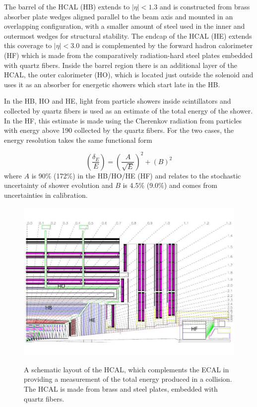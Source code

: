 The barrel of the HCAL (HB) extends to $|\eta|<1.3$ 
 and is constructed from brass absorber plate wedges aligned parallel 
 to the beam axis and mounted in an overlapping configuration,
 with a smaller amount of steel used in the inner and outermost
 wedges for structural stability.
The endcap of the HCAL (HE) extends this coverage to $|\eta|<3.0$
 and is complemented by the forward hadron calorimeter (HF)
 which is made from the comparatively radiation-hard 
 steel plates embedded with quartz fibers.
Inside the barrel region there is an additional layer of the
 HCAL, the outer calorimeter (HO), which is located just
 outside the solenoid and uses it as an absorber 
 for energetic showers which start late in the HB.

In the HB, HO and HE, light from particle showers
 inside scintillators and collected by quartz fibers
 is used as an estimate of the total energy of the shower.
In the HF, this estimate is made using the Cherenkov 
 radiation from particles with energy above 190 \keV
 collected by the quartz fibers.
For the two cases, the energy resolution takes the same
 functional form 

\begin{equation}\label{eq:hcal_res}
 \left(\frac{\delta_E}{E}\right) =  \left(\frac{A}{\sqrt{E}}\right)^2 + (B)^2 
\end{equation}
 where $A$ is 90$\%$ (172$\%$) in the HB/HO/HE (HF)
  and relates to the stochastic uncertainty of shower evolution
 and $B$ is 4.5$\%$ (9.0$\%$) and comes from uncertainties in calibration.


\begin{figure}[tb]
\caption[The CMS Hadronic Calorimeter]{
 A schematic layout of the HCAL, which complements the ECAL
  in providing a measurement of the total energy produced 
  in a collision.
 The HCAL is made from brass and steel plates,
  embedded with quartz fibers.
 }
\includegraphics[width=\textwidth]{pdfs/experiment/cms_hcal.pdf}
\label{fig:hcal}
\end{figure}
 

